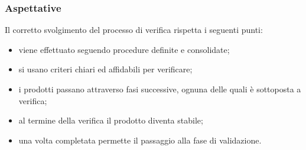         \subsubsection{Aspettative}
        Il corretto svolgimento del processo di verifica rispetta i seguenti punti:
        \begin{itemize}
            \item viene effettuato seguendo procedure definite e consolidate;
            \item si usano criteri chiari ed affidabili per verificare;
            \item i prodotti passano attraverso fasi successive, ognuna delle quali è sottoposta a verifica;
            \item al termine della verifica il prodotto diventa stabile;
            \item una volta completata permette il passaggio alla fase di validazione.
        \end{itemize}
